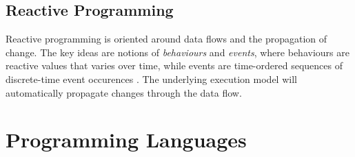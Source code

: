 \subsection{Reactive Programming}
Reactive programming is oriented around data flows and the propagation
of change. The key ideas are notions of \emph{behaviours} and
\emph{events}, where behaviours are reactive values that varies over
time, while events are time-ordered sequences of discrete-time event
occurences \citep{wan:2000}. The underlying execution model will
automatically propagate changes through the data flow.


\section{Programming Languages}




